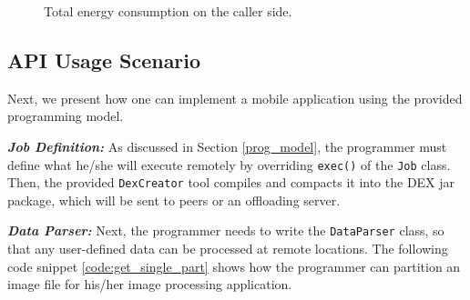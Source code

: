 \documentclass{sig-alternate}
\begin{document}
\begin{figure}
	\hspace*{-0.15cm}
	\caption{Total energy consumption on the caller side.}
	\label{fig:microb_24}
\end{figure}


\subsection{API Usage Scenario}
\label{sec:apiusage}
Next, we present how one can implement a mobile application using the provided programming model.

\textbf{\emph{Job Definition:}} As discussed in Section \ref{prog_model}, the programmer must define what he/she will execute remotely by overriding \texttt{exec()} of the \texttt{Job} class. Then, the provided \texttt{DexCreator} tool compiles and compacts it into the DEX jar package, which will be sent to peers or an offloading server. 



\textbf{\emph{Data Parser:}} Next, the programmer needs to write the \texttt{DataParser} class, so that any user-defined data can be processed at remote locations. The following code snippet \ref{code:get_single_part} shows how the programmer can partition an image file for his/her image processing application.
\end{document}
